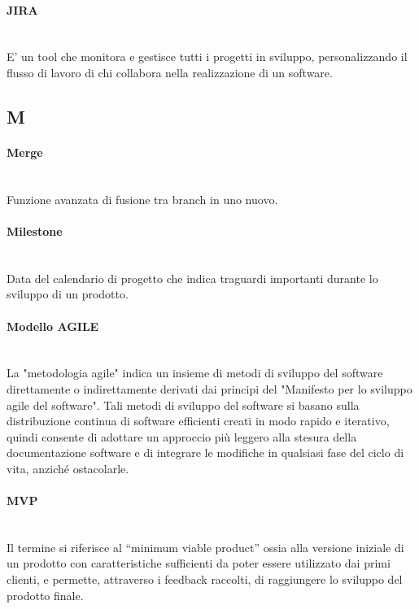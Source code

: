 \paragraph{JIRA}~\smallskip \\
E' un tool che monitora e gestisce tutti i progetti in sviluppo, personalizzando il flusso di lavoro di chi collabora nella realizzazione di un software.

\newpage
{}
\subsection*{M}

\paragraph{Merge}~\smallskip \\
Funzione avanzata di fusione tra branch in uno nuovo.

\paragraph{Milestone}~\smallskip \\
Data del calendario di progetto che indica traguardi importanti durante lo sviluppo di un prodotto.

\paragraph{Modello AGILE}~\smallskip \\
La "metodologia agile" indica un insieme di metodi di sviluppo del software direttamente o indirettamente derivati dai principi del "Manifesto per lo sviluppo agile del software".
Tali metodi di sviluppo del software si basano sulla distribuzione continua di software efficienti creati in modo rapido e iterativo, quindi
consente di adottare un approccio più leggero alla stesura della documentazione software e di integrare le modifiche in qualsiasi fase del ciclo di vita, anziché ostacolarle.

\paragraph{MVP}~\smallskip \\
Il termine si riferisce al “minimum viable product” ossia alla versione iniziale di un prodotto con 
caratteristiche sufficienti da poter essere utilizzato dai primi clienti, e permette, attraverso i feedback raccolti, di raggiungere lo sviluppo del prodotto finale.
\newpage
{}
